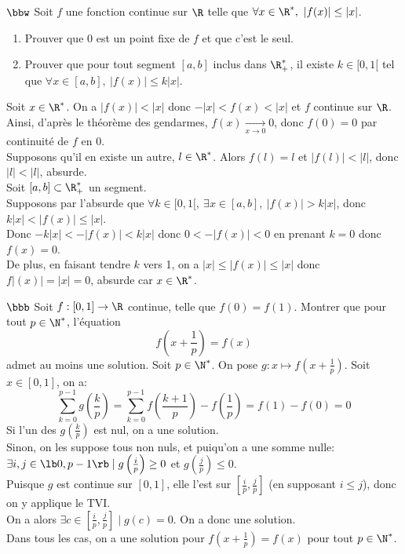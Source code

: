 \documentclass[11pt]{article}
\begin{document}
\begin{exercice}{$\bbw$}{}
    Soit $f$ une fonction continue sur $\R$ telle que $\forall x \in \R^*, ~ |f(x)|\leq|x|$.
    \begin{enumerate}
        \item Prouver que 0 est un point fixe de $f$ et que c'est le seul.
        \item Prouver que pour tout segment $[a,b]$ inclus dans $\R_+^*$, il existe $k\in[0,1[$ tel que $\forall x \in [a,b], ~ |f(x)|\leq k|x|$.
    \end{enumerate}
    \tcblower
     Soit $x\in\R^*$. On a $|f(x)|<|x|$ donc $-|x|<f(x)<|x|$ et $f$ continue sur $\R$.\\
    Ainsi, d'après le théorème des gendarmes, $f(x)\xrightarrow[x\to0]{}0$, donc $f(0)=0$ par continuité de $f$ en 0.\\
    Supposons qu'il en existe un autre, $l\in\R^*$. Alors $f(l)=l$ et $|f(l)|<|l|$, donc $|l|<|l|$, absurde.\\
     Soit $[a,b]\subset\R^*_+$ un segment.\\
    Supposons par l'absurde que $\forall k \in [0,1[, ~ \exists x \in [a,b], ~ |f(x)|>k|x|$, donc $k|x|<|f(x)|\leq|x|$.\\
    Donc $-k|x|<-|f(x)|<k|x|$ donc $0<-|f(x)|<0$ en prenant $k=0$ donc $f(x)=0$.\\
    De plus, en faisant tendre $k$ vers 1, on a $|x|\leq|f(x)|\leq|x|$ donc $f|(x)|=|x|=0$, absurde car $x\in\R^*$.
\end{exercice}

\begin{exercice}{$\bbb$}{}
    Soit $f:[0,1]\to\R$ continue, telle que $f(0)=f(1)$. Montrer que pour tout $p\in\N^*$, l'équation
    \begin{equation*}
        f\left( x+\frac{1}{p} \right)=f(x)
    \end{equation*}
    admet au moins une solution.
    \tcblower
    Soit $p\in\N^*$. On pose $g:x\mapsto f\left( x+\frac{1}{p} \right)$. Soit $x\in[0,1]$, on a:
    \begin{equation*}
        \sum_{k=0}^{p-1} g\left(\frac{k}{p}\right) = \sum_{k=0}^{p-1} f\left( \frac{k+1}{p} \right) - f\left( \frac{1}{p} \right) = f(1) - f(0) = 0
    \end{equation*}
    Si l'un des $g\left( \frac{k}{p} \right)$ est nul, on a une solution.\\
    Sinon, on les suppose tous non nuls, et puiqu'on a une somme nulle: $\exists i,j \in \lb0,p-1\rb \mid g\left( \frac{i}{p} \right)\geq0$ et $g\left( \frac{j}{p} \right)\leq0$.\\
    Puisque $g$ est continue sur $[0,1]$, elle l'est sur $[\frac{i}{p},\frac{j}{p}]$ (en supposant $i\leq j$), donc on y applique le TVI.\\
    On a alors $\exists c\in[\frac{i}{p},\frac{j}{p}]\mid g(c)=0$. On a donc une solution.\\
    Dans tous les cas, on a une solution pour $f\left( x+\frac{1}{p} \right)=f(x)$ pour tout $p\in\N^*$.
\end{exercice}
\end{document}
